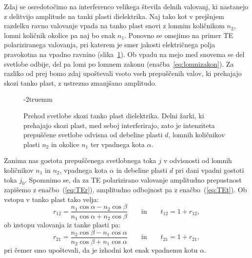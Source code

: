 Zdaj se osredotočimo na interferenco velikega števila delnih 
valovanj, ki nastanejo z delitvijo amplitude na tanki plasti dielektrika.
Naj tako kot v prejšnjem razdelku ravno valovanje vpada na tanko plast 
snovi z lomnim količnikom $n_2$, lomni količnik okolice pa naj bo enak $n_1$. 
Ponovno se omejimo na primer TE polariziranega valovanja, pri katerem
je smer jakosti električnega polja pravokotna na vpadno ravnino 
(slika~\ref{fig:06_plastmulti}). Ob vpadu na mejo med snovema se del 
svetlobe odbije, del pa lomi po lomnem zakonu (enačba~\ref{eq:lomnizakon}).
Za razliko od prej bomo zdaj upoštevali vsoto vseh prepuščenih valov, 
ki prehajajo skozi tanko plast, z ustrezno zmanjšano amplitudo.
\begin{figure}[ht]
\centering
\def\svgwidth{70truemm} 

\caption{Prehod svetlobe skozi tanko plast dielektrika. Delni žarki, ki prehajajo
skozi plast, med seboj interferirajo, zato je intenziteta prepuščene svetlobe odvisna
od debeline plasti $d$, lomnih količnikov plasti $n_2$ in okolice $n_1$ ter vpadnega 
kota $\alpha$. }
\vglue-2truemm
\label{fig:06_plastmulti}
\end{figure}

Zanima nas gostota prepuščenega svetlobnega toka $j$ v odvisnosti od 
lomnih količnikov $n_1$ in $n_2$, vpadnega kota $\alpha$ in debeline plasti $d$ pri dani
vpadni gostoti toka $j_0$. Spomnimo se, da za TE polarizirano valovanje
amplitudno prepustnost zapišemo z enačbo~(\ref{eq:TEr}), amplitudno odbojnost
pa z enačbo~(\ref{eq:TEt}). Ob vstopu v tanko plast tako velja:
\begin{equation}
r_{12} = \frac{n_1\cos \alpha - n_2\cos \beta}{n_1\cos \alpha + n_2\cos \beta}\qquad 
\mathrm{in}\qquad t_{12} = 1+r_{12},
\label{eq:06_35}
\end{equation}
ob izstopu valovanja iz tanke plasti pa:
\begin{equation}
r_{21} = \frac{n_2\cos \beta - n_1\cos \alpha}{n_2\cos \beta + n_1\cos \alpha}\qquad 
\mathrm{in}\qquad t_{21} = 1+r_{21},
\label{eq:06_36}
\end{equation}
pri čemer smo upoštevali, da je izhodni kot enak vpadnemu kotu $\alpha$. 


